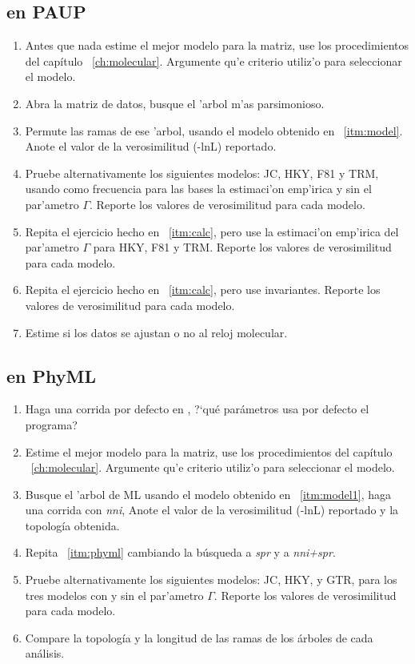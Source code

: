 \subsection{en PAUP}
\noindent
\begin{enumerate}
\item\label{itm:model} Antes que nada estime el mejor modelo para la matriz, use los procedimientos del cap\'itulo ~\ref{ch:molecular}. Argumente qu'e criterio utiliz'o para seleccionar el modelo.
\item Abra la matriz de datos, busque el 'arbol m'as parsimonioso.
\item Permute las ramas de ese 'arbol, usando el modelo obtenido en ~\ref{itm:model}. Anote el valor de la verosimilitud (-lnL) reportado.
\item\label{itm:calc} Pruebe alternativamente los siguientes modelos: JC, HKY, F81 y TRM, usando como frecuencia para las bases la estimaci'on emp'irica y sin el par'ametro $\Gamma$. Reporte los valores de verosimilitud para cada modelo.
\item Repita el ejercicio hecho en ~\ref{itm:calc}, pero use la estimaci'on emp'irica del par'ametro $\Gamma$ para HKY, F81 y TRM. Reporte los valores de verosimilitud para cada modelo.
\item Repita el ejercicio hecho en ~\ref{itm:calc}, pero use invariantes. Reporte los valores de verosimilitud para cada modelo.
\item Estime si los datos se ajustan o no al reloj molecular.
\end{enumerate}

\subsection{en PhyML}
\noindent
\begin{enumerate}
\item Haga una corrida por defecto en , ?`qu\'e par\'ametros usa por defecto el programa?
\item\label{itm:model1} Estime el mejor modelo para la matriz, use los procedimientos del cap\'itulo ~\ref{ch:molecular}. Argumente qu'e criterio utiliz'o para seleccionar el modelo.
\item\label{itm:phyml} Busque el 'arbol de ML usando el modelo obtenido 
en ~\ref{itm:model1}, haga una corrida con \textit{nni},  Anote el valor de la verosimilitud (-lnL) reportado y la topolog\'ia obtenida.
\item Repita ~\ref{itm:phyml} cambiando la b\'usqueda a \textit{spr} y a 
\textit{nni+spr}.
\item Pruebe alternativamente los siguientes modelos: JC, HKY, y GTR, 
para los tres modelos con y sin el par'ametro $\Gamma$. Reporte los valores de verosimilitud para cada modelo.
\item Compare la topolog\'ia y la longitud de las ramas de los \'arboles de cada an\'alisis.
\end{enumerate}


